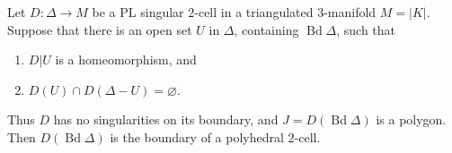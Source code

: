 Let $D: \Delta \to M$ be a PL singular $2$-cell in a triangulated $3$-manifold $M = |K|$. Suppose that there is an open set $U$ in $\Delta$, containing $\operatorname{Bd} \Delta$, such that

\begin{enumerate}
  \item $D|U$ is a homeomorphism, and
  \item $D(U) \cap D(\Delta - U) = \varnothing$.
\end{enumerate}

Thus $D$ has no singularities on its boundary, and $J = D(\operatorname{Bd} \Delta)$ is a polygon. Then $D(\operatorname{Bd} \Delta)$ is the boundary of a polyhedral $2$-cell.
